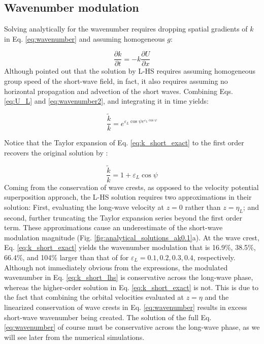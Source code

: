 \documentclass[lineno]{jfm}
\begin{document}
\subsection{Wavenumber modulation}
\label{subsection:wavenumber_modulation}

Solving analytically for the wavenumber requires dropping spatial gradients of
$k$ in Eq. \ref{eq:wavenumber} and assuming homogeneous $g$:

\begin{equation}
\label{eq:wavenumber2}
\dfrac{\partial k}{\partial t}
= - k \dfrac{\partial U}{\partial x}
\end{equation}
Although \citet{peureux2021unsteady} pointed out that the solution by L-HS
requires assuming homogeneous group speed of the short-wave field, in fact,
it also requires assuming no horizontal propagation and advection of the short
waves.
Combining Eqs. \ref{eq:U_L} and \ref{eq:wavenumber2}, and integrating it in time
yields:

\begin{equation}
\label{eq:k_short_exact}
\frac{\widetilde{k}}{k} = e^{\varepsilon_L \cos{\psi} e^{\varepsilon_L \cos{\psi}}}
\end{equation}

Notice that the Taylor expansion of Eq. \ref{eq:k_short_exact} to the first order
recovers the original solution by \citet{longuet1960changes}:

\begin{equation}
\label{eq:k_short_lhs}
\frac{\widetilde{k}}{k} = 1 + \varepsilon_L \cos{\psi}
\end{equation}
Coming from the conservation of wave crests, as opposed to the velocity potential
superposition approach, the L-HS solution requires two approximations in their
solution:
First, evaluating the long-wave velocity at $z = 0$ rather than $z = \eta_L$; and
second, further truncating the Taylor expansion series beyond the first order term.
These approximations cause an underestimate of the short-wave modulation
magnitude (Fig. \ref{fig:analytical_solutions_ak0.1}a).
At the wave crest, Eq. \ref{eq:k_short_exact} yields the wavenumber modulation
that is 16.9\%, 38.5\%, 66.4\%, and 104\% larger than that of \citet{longuet1960changes}
for $\varepsilon_L = 0.1, 0.2, 0.3, 0.4$, respectively.
Although not immediately obvious from the expressions, the modulated wavenumber
in Eq. \ref{eq:k_short_lhs} is conservative across the long-wave phase, whereas
the higher-order solution in Eq. \ref{eq:k_short_exact} is not.
This is due to the fact that combining the orbital velocities evaluated at
$z=\eta$ and the linearized conservation of wave crests in Eq. \ref{eq:wavenumber}
results in excess short-wave wavenumber being created.
The solution of the full Eq. \ref{eq:wavenumber} of course must be conservative
across the long-wave phase, as we will see later from the numerical simulations.
\end{document}
